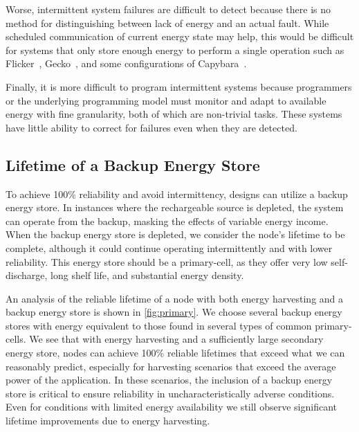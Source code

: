 Worse, intermittent system failures are difficult to detect %
because there is no method for distinguishing between lack of energy
and an actual fault. While scheduled communication of current energy state
may help, this would be difficult for systems that only store enough
energy to perform a single operation such as Flicker~\cite{hesterFlicker17},
Gecko~\cite{yervaGrafting12}, and some configurations of
Capybara~\cite{colinReconfigurable18}.

Finally, it is more difficult
to program intermittent systems because programmers or the underlying
programming model must monitor and adapt to available energy with fine
granularity, both of which are non-trivial tasks.
These systems have little ability to correct for failures
even when they are detected.

\subsection{Lifetime of a Backup Energy Store}
\label{sec:primary:lifetime}

To achieve 100\% reliability and avoid intermittency,
designs can utilize a backup energy store.
In instances where the rechargeable source is depleted, the system
can operate from the backup, masking the effects of variable energy income.
When the backup energy store is depleted, we consider the node's lifetime
to be complete, although it could continue
operating intermittently and with lower reliability. This energy store should
be a primary-cell, as they offer very low self-discharge, long shelf life, and
substantial energy density.

An analysis of the reliable lifetime of a node with both energy
harvesting and a backup energy store is shown in \cref{fig:primary}.
We choose several backup energy
stores with energy equivalent to those found in several types of common
primary-cells. We see that with energy harvesting and a sufficiently
large secondary energy store, nodes can
achieve 100\% reliable lifetimes that exceed
what we can reasonably predict, especially for harvesting scenarios that
exceed the average power of the application. In these scenarios, 
the inclusion of a backup energy store is critical 
to ensure reliability in uncharacteristically adverse conditions.
Even for conditions with
limited energy availability we still observe significant lifetime improvements
due to energy harvesting.

